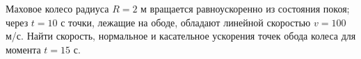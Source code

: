 Маховое колесо радиуса $R=2$ м вращается равноускоренно из состояния
покоя; через $t=10$ с точки, лежащие на ободе, обладают линейной
скоростью $v=100$ м/с. Найти скорость, нормальное и касательное
ускорения точек обода колеса для момента $t=15$ с.
